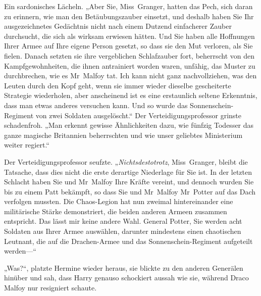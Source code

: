 Ein sardonisches Lächeln. „Aber Sie, Miss~Granger, hatten das Pech, sich daran zu erinnern, wie man den Betäubungszauber einsetzt, und deshalb haben Sie Ihr ausgezeichnetes Gedächtnis nicht nach einem Dutzend einfacherer Zauber durchsucht, die sich als wirksam erwiesen hätten. Und Sie haben alle Hoffnungen Ihrer Armee auf Ihre eigene Person gesetzt, so dass sie den Mut verloren, als Sie fielen. Danach setzten sie ihre vergeblichen Schlafzauber fort, beherrscht von den Kampfgewohnheiten, die ihnen antrainiert worden waren, unfähig, das Muster zu durchbrechen, wie es Mr~Malfoy tat. Ich kann nicht ganz nachvollziehen, was den Leuten durch den Kopf geht, wenn sie immer wieder dieselbe gescheiterte Strategie wiederholen, aber anscheinend ist es eine erstaunlich seltene Erkenntnis, dass man etwas anderes versuchen kann. Und so wurde das Sonnenschein-Regiment von zwei Soldaten ausgelöscht.“ Der Verteidigungsprofessor grinste schadenfroh. „Man erkennt gewisse Ähnlichkeiten dazu, wie fünfzig Todesser das ganze magische Britannien beherrschten und wie unser geliebtes Ministerium weiter regiert.“

Der Verteidigungsprofessor seufzte. „\emph{Nichtsdestotrotz}, Miss~Granger, bleibt die Tatsache, dass dies nicht die erste derartige Niederlage für Sie ist. In der letzten Schlacht haben Sie und Mr~Malfoy Ihre Kräfte vereint, und dennoch wurden Sie bis zu einem Patt bekämpft, so dass Sie und Mr~Malfoy Mr~Potter auf das Dach verfolgen mussten. Die Chaos-Legion hat nun zweimal hintereinander eine militärische Stärke demonstriert, die beiden anderen Armeen zusammen entspricht. Das lässt mir keine andere Wahl. General Potter, Sie werden acht Soldaten aus Ihrer Armee auswählen, darunter mindestens einen chaotischen Leutnant, die auf die Drachen-Armee und das Sonnenschein-Regiment aufgeteilt werden—“

„Was?“, platzte Hermine wieder heraus, sie blickte zu den anderen Generälen hinüber und sah, dass Harry genauso schockiert aussah wie sie, während Draco Malfoy nur resigniert schaute.

